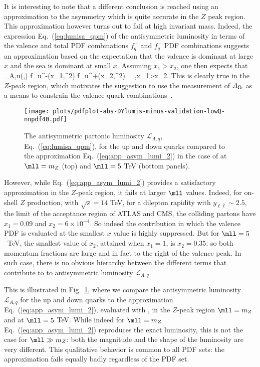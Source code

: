 It is interesting to note that a different conclusion is reached using
an approximation to the asymmetry which is quite accurate  in the $Z$
peak region.
%
This approximation however turns out to fail at high
invariant mass.
%
Indeed, the expression Eq.~(\ref{eq:lumisa_qpm}) of the antisymmetric
luminosity in terms of the valence 
and total PDF combinations $f_q^+$ and $f_q^-$ PDF combinations
suggests an approximation based on the expectation
that the valence is dominant at large $x$ and the sea is dominant at
small $x$. Assuming $x_1> x_2$, one then expects that
\be
{}_{A,u}(\yll,\mll) \approx{} f_u^-(x_1,\mll^2)
f_{u}^+(x_2,\mll^2)   \,  \, ,\quad x_1>x_2.
\label{eq:app_asym_lumi_2}
\ee
This is clearly true  in the $Z$-peak region, which  motivates the
suggestion to use the measurement of $A_{\rm fb}$ as a means to
 constrain the valence quark combinations~\cite{Accomando:2019vqt}.

\begin{figure}[!t]
 \centering
 \texttt{[image: plots/pdfplot-abs-DYlumis-minus-validation-lowQ-nnpdf40.pdf]}
 \caption{The  antisymmetric partonic luminosity $\mathcal{L}_{A,q}$, Eq.~(\ref{eq:lumisa_qpm}),
for the up and down quarks 
compared to the approximation 
Eq.~(\ref{eq:app_asym_lumi_2}) in the case of 
at $\mll=m_Z$ (top)
and $\mll=5$ TeV (bottom panels).
 }    
 \label{fig:pdfplot-abs-DYlumis-minus-validation-lowQ-nnpdf40}
\end{figure}

However, while Eq.~(\ref{eq:app_asym_lumi_2}) provides
a satisfactory approximation in the  $Z$-peak region,
it fails  at larger $\mll$ values. Indeed, for on-shell $Z$
production, with $\sqrt{s}=14$ TeV,
for a dilepton rapidity with $y_{\ell\bar{\ell}}\sim 2.5$, the limit of the
acceptance region
of ATLAS and CMS, the colliding partons have
$x_1=0.09$ and $x_2=6\times 10^{-4}$. So indeed the contribution in
which the valence PDF is evaluated at the smallest $x$ value is highly suppressed.
%
But for $\mll=5$~TeV, the smallest value of $x_2$, attained when
$x_1=1$, is $x_2=0.35$: so both momentum fractions are large and in fact
to the right of the valence peak.
%
In such case, there 
is no obvious hierarchy between
the different terms that contribute to to antisymmetric
luminosity $\mathcal{L}_{A,q}$.

This is illustrated in
Fig.~\ref{fig:pdfplot-abs-DYlumis-minus-validation-lowQ-nnpdf40},
where we compare the antisymmetric luminosity $\mathcal{L}_{A,q}$
for the up and down quarks 
to the approximation
Eq.~(\ref{eq:app_asym_lumi_2}), evaluated with  \nnlo,
in the $Z$-peak region $\mll=m_Z$ 
and at $\mll=5$ TeV.
%
While indeed for $\mll=m_Z$ Eq.~(\ref{eq:app_asym_lumi_2}) reproduces
the exact luminosity, this is not the case for $\mll\gg m_Z$: both
the magnitude and the shape of the luminosity are  very different.
%
This qualitative behavior is common to all PDF sets: the approximation
fails equally badly regardless of the PDF set.

